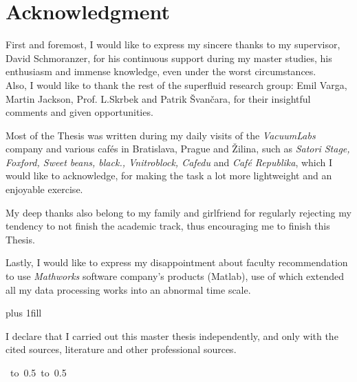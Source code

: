 \chapter*{Acknowledgment}

First and foremost, I would like to express my sincere thanks to my supervisor, David Schmoranzer, for his continuous support during my master studies, his enthusiasm and immense knowledge, even under the worst circumstances.\\
Also, I would like to thank the rest of the superfluid research group: Emil Varga, Martin Jackson, Prof. L.Skrbek and Patrik Švančara, for their insightful comments and given opportunities.

Most of the Thesis was written during my daily visits of the 	\textit{VacuumLabs} company and various cafés in Bratislava, Prague and Žilina, such as \textit{Satori Stage, Foxford, Sweet beans, black., Vnitroblock, Cafedu} and \textit{Café Republika}, which I would like to acknowledge, for making the task a lot more lightweight and an enjoyable exercise.

My deep thanks also belong to my family and girlfriend for regularly rejecting my tendency to not finish the academic track, thus encouraging me to finish this Thesis.

Lastly, I would like to express my disappointment about faculty recommendation to use \textit{Mathworks} software company's products (Matlab), use of which extended all my data processing works into an abnormal time scale.

\vglue 0pt plus 1fill

\noindent
I declare that I carried out this master thesis independently, and only with the cited
sources, literature and other professional sources.


\vspace{10mm}

\hbox{
	\hbox to 0.5
	\hbox to 0.5
	}

\newpage
